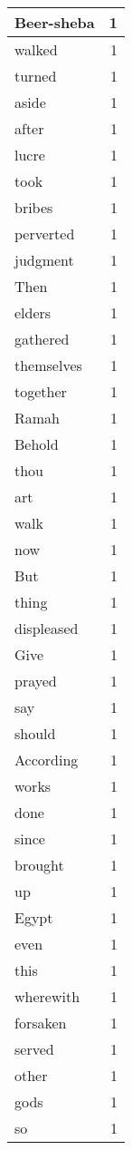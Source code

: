 \begin{center}
\begin{longtable}{l|r}
Beer-sheba & 1 \\ \hline
walked & 1 \\ \hline
turned & 1 \\ \hline
aside & 1 \\ \hline
after & 1 \\ \hline
lucre & 1 \\ \hline
took & 1 \\ \hline
bribes & 1 \\ \hline
perverted & 1 \\ \hline
judgment & 1 \\ \hline
Then & 1 \\ \hline
elders & 1 \\ \hline
gathered & 1 \\ \hline
themselves & 1 \\ \hline
together & 1 \\ \hline
Ramah & 1 \\ \hline
Behold & 1 \\ \hline
thou & 1 \\ \hline
art & 1 \\ \hline
walk & 1 \\ \hline
now & 1 \\ \hline
But & 1 \\ \hline
thing & 1 \\ \hline
displeased & 1 \\ \hline
Give & 1 \\ \hline
prayed & 1 \\ \hline
say & 1 \\ \hline
should & 1 \\ \hline
According & 1 \\ \hline
works & 1 \\ \hline
done & 1 \\ \hline
since & 1 \\ \hline
brought & 1 \\ \hline
up & 1 \\ \hline
Egypt & 1 \\ \hline
even & 1 \\ \hline
this & 1 \\ \hline
wherewith & 1 \\ \hline
forsaken & 1 \\ \hline
served & 1 \\ \hline
other & 1 \\ \hline
gods & 1 \\ \hline
so & 1 \\ \hline

\end{longtable}
\end{center}
